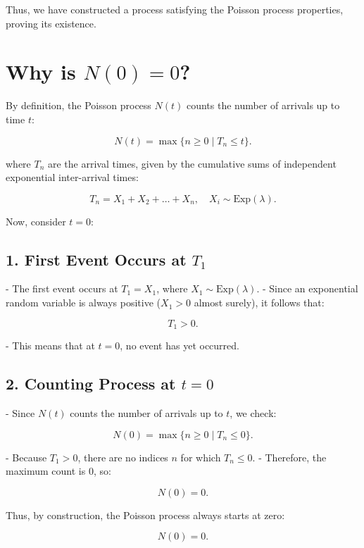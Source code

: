 \documentclass{article}
\begin{document}
Thus, we have constructed a process satisfying the Poisson process properties, proving its existence.

\section*{Why is \( N(0) = 0 \)?}

By definition, the Poisson process \( N(t) \) counts the number of arrivals up to time \( t \):

\[
N(t) = \max \{n \geq 0 \mid T_n \leq t\}.
\]

where \( T_n \) are the arrival times, given by the cumulative sums of independent exponential inter-arrival times:

\[
T_n = X_1 + X_2 + \dots + X_n, \quad X_i \sim \text{Exp}(\lambda).
\]

Now, consider \( t = 0 \):

\subsection*{1. First Event Occurs at \( T_1 \)}

- The first event occurs at \( T_1 = X_1 \), where \( X_1 \sim \text{Exp}(\lambda) \).
- Since an exponential random variable is always positive (\( X_1 > 0 \) almost surely), it follows that:

\[
T_1 > 0.
\]

- This means that at \( t = 0 \), no event has yet occurred.

\subsection*{2. Counting Process at \( t = 0 \)}

- Since \( N(t) \) counts the number of arrivals up to \( t \), we check:

\[
N(0) = \max \{n \geq 0 \mid T_n \leq 0\}.
\]

- Because \( T_1 > 0 \), there are no indices \( n \) for which \( T_n \leq 0 \).
- Therefore, the maximum count is \( 0 \), so:

\[
N(0) = 0.
\]

Thus, by construction, the Poisson process always starts at zero:

\[
N(0) = 0.
\]
\end{document}
